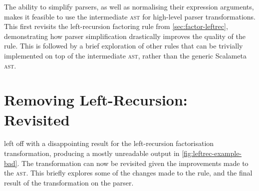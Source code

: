\documentclass[../../main.tex]{subfiles}
\begin{document}
\label{sec:complex-rules}
The ability to simplify parsers, as well as normalising their expression arguments, makes it feasible to use the intermediate  \textsc{ast} for high-level parser transformations.
This  first revisits the left-recursion factoring rule from \cref{sec:factor-leftrec}, demonstrating how parser simplification drastically improves the quality of the rule.
This is followed by a brief exploration of other rules that can be trivially implemented on top of the intermediate \textsc{ast}, rather than the generic Scalameta \textsc{ast}.


\section{Removing Left-Recursion: Revisited}\label{sec:leftrec-revisited}
 left off with a disappointing result for the left-recursion factorisation transformation, producing a mostly unreadable output in \cref{fig:leftrec-example-bad}.
The transformation can now be revisited given the improvements made to the  \textsc{ast}.
This  briefly explores some of the changes made to the rule, and the final result of the transformation on the  parser.
\end{document}
